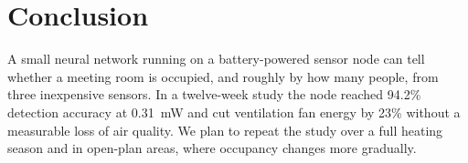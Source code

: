 \section{Conclusion}\label{sec:conclusion}
A small neural network running on a battery-powered sensor node can tell whether a meeting room is occupied, and roughly by how many people, from three inexpensive sensors. In a twelve-week study the node reached 94.2\% detection accuracy at 0.31~mW and cut ventilation fan energy by 23\% without a measurable loss of air quality. We plan to repeat the study over a full heating season and in open-plan areas, where occupancy changes more gradually.
